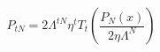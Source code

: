 \begin{equation} \label{replicaP}
P_{tN} = 2 \Lambda^{tN} \eta^t T_{t} \left(\frac{P_{N}(x)}{2 \eta \Lambda^N} \right)
\end{equation}

